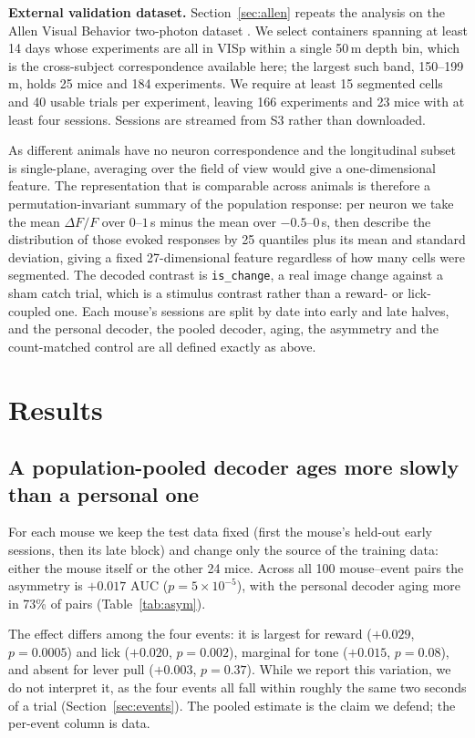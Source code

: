 \documentclass{article}
\newcommand{\auc}{\mathrm{AUC}}
\begin{document}
\textbf{External validation dataset.} Section~\ref{sec:allen} repeats the analysis on the Allen
Visual Behavior two-photon dataset \citep{allenvb2023}. We select containers spanning at least 14
days whose experiments are all in VISp within a single 50\,\textmu m depth bin, which is the
cross-subject correspondence available here; the largest such band, 150--199\,\textmu m, holds 25
mice and 184 experiments. We require at least 15 segmented cells and 40 usable trials per
experiment, leaving 166 experiments and 23 mice with at least four sessions. Sessions are streamed
from S3 rather than downloaded.

As different animals have no neuron correspondence and the longitudinal subset is single-plane,
averaging over the field of view would give a one-dimensional feature. The representation that is
comparable across animals is
therefore a permutation-invariant summary of the population response: per neuron we take the mean
$\Delta F/F$ over $0$--$1$\,s minus the mean over $-0.5$--$0$\,s, then describe the distribution of
those evoked responses by 25 quantiles plus its mean and standard deviation, giving a fixed
27-dimensional feature regardless of how many cells were segmented. The decoded contrast is
\texttt{is\_change}, a real image change against a sham catch trial, which is a stimulus contrast
rather than a reward- or lick-coupled one. Each mouse's sessions are split by date into early and
late halves, and the personal decoder, the pooled decoder, aging, the asymmetry and the
count-matched control are all defined exactly as above.

\section{Results}

\subsection{A population-pooled decoder ages more slowly than a personal one}
\label{sec:asym}
For each mouse we keep the test data fixed (first the mouse's held-out early sessions, then its late
block) and change only the source of the training data: either the mouse itself or the other 24 mice.
Across all 100 mouse--event pairs the asymmetry is $+0.017$ $\auc$ ($p = 5 \times 10^{-5}$), with the
personal decoder aging more in 73\% of pairs (Table~\ref{tab:asym}).

The effect differs among the four events: it is largest for reward ($+0.029$, $p = 0.0005$) and lick
($+0.020$, $p = 0.002$), marginal for tone ($+0.015$, $p = 0.08$), and absent for lever pull
($+0.003$, $p = 0.37$). While we report this variation, we do not interpret it, as the four events
all fall within roughly the same two seconds of a trial (Section~\ref{sec:events}). The pooled
estimate is the claim we defend; the per-event column is data.
\end{document}
